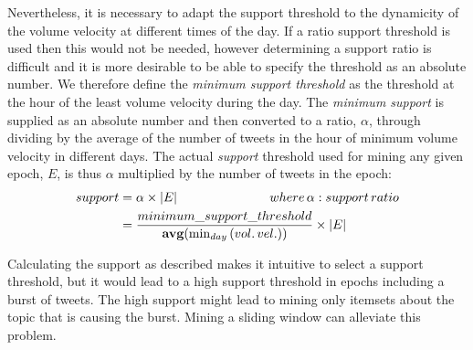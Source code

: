 \documentclass[letterpaper,12pt,titlepage,oneside,final]{book}
\begin{document}
Nevertheless, it is necessary to 
adapt the support threshold to the dynamicity of the volume velocity at
different times of the day.
If a ratio support threshold is used then this would not be needed,
however determining a support ratio is difficult 
and it is more desirable to be able to specify the threshold
as an absolute number. 
We therefore define the \emph{minimum support threshold} as the threshold at the hour
of the least volume velocity during the day.
The \emph{minimum support} is supplied as an absolute number %
and then converted to a ratio, $\alpha$, %
through dividing by the average of the number of tweets in the hour of minimum volume velocity in different days. 
The actual \emph{support} threshold used for mining any given epoch, $E$, is thus
$\alpha$ multiplied by the number of tweets in the epoch: %
\begin{align}
support &= \alpha \times |E|  \hspace*{1in}  where\,\alpha: support\,ratio\\ %
&= \frac{minimum\_support\_threshold}{\textbf{avg}(\min_{day}{(vol.\, vel.)})} \times |E| %
\end{align}

Calculating the support as described makes it intuitive to select a support threshold,
but it would lead to a high support threshold in epochs including a burst of tweets. %
The high support might lead to mining only itemsets
about the topic that is causing the burst.
Mining a sliding window can alleviate this problem.
\end{document}
